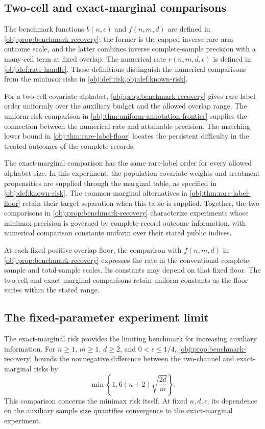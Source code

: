 \documentclass[11pt]{article}
\begin{document}
\subsection{Two-cell and exact-marginal comparisons}

The benchmark functions \(b(n,\epsilon)\) and \(f(n,m,d)\) are defined in \cref{obj:prop:benchmark-recovery}: the former is the capped inverse rare-arm outcome scale, and the latter combines inverse complete-sample precision with a many-cell term at fixed overlap. The numerical rate \(r(n,m,d,\epsilon)\) is defined in \cref{obj:def:rate-handle}. These definitions distinguish the numerical comparisons from the minimax risks in \cref{obj:def:risk,obj:def:known-risk}.

For a two-cell covariate alphabet, \cref{obj:prop:benchmark-recovery} gives rare-label order uniformly over the auxiliary budget and the allowed overlap range. The uniform risk comparison in \cref{obj:thm:uniform-annotation-frontier} supplies the connection between the numerical rate and attainable precision. The matching lower bound in \cref{obj:thm:rare-label-floor} locates the persistent difficulty in the treated outcomes of the complete records.

The exact-marginal comparison has the same rare-label order for every allowed alphabet size. In this experiment, the population covariate weights and treatment propensities are supplied through the marginal table, as specified in \cref{obj:def:known-risk}. The common-marginal alternatives in \cref{obj:thm:rare-label-floor} retain their target separation when this table is supplied. Together, the two comparisons in \cref{obj:prop:benchmark-recovery} characterize experiments whose minimax precision is governed by complete-record outcome information, with numerical comparison constants uniform over their stated public indices.

At each fixed positive overlap floor, the comparison with \(f(n,m,d)\) in \cref{obj:prop:benchmark-recovery} expresses the rate in the conventional complete-sample and total-sample scales. Its constants may depend on that fixed floor. The two-cell and exact-marginal comparisons retain uniform constants as the floor varies within the stated range.

\subsection{The fixed-parameter experiment limit}

The exact-marginal risk provides the limiting benchmark for increasing auxiliary information. For \(n\ge1\), \(m\ge1\), \(d\ge2\), and \(0<\epsilon\le1/4\), \cref{obj:prop:benchmark-recovery} bounds the nonnegative difference between the two-channel and exact-marginal risks by
\[
\min\left\{1,6(n+2)\sqrt{\frac{2d}{m}}\right\}.
\]
This comparison concerns the minimax risk itself. At fixed \(n,d,\epsilon\), its dependence on the auxiliary sample size quantifies convergence to the exact-marginal experiment.
\end{document}
